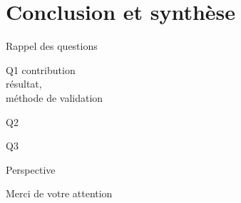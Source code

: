 \section{Conclusion et synthèse}
\begin{frame}{Rappel des questions}
\end{frame}

\begin{frame}{Q1}
 contribution\\
résultat, \\
méthode de validation   
\end{frame}

\begin{frame}{Q2}
\end{frame}

\begin{frame}{Q3}
    
\end{frame}

\begin{frame}{Perspective}
    
\end{frame}

\begin{frame}[plain]
    Merci de votre attention
\end{frame}
